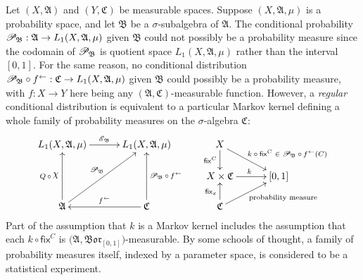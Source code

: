 \documentclass[
twoside=true,
paper=letter,
fontsize=9pt,
pagesize=auto,
leqno,
openany,
headsepline,
overfullrule,
]{scrbook}
\theoremstyle{plain}
\theoremstyle{plain}
\theoremstyle{definition}
\theoremstyle{bfnoteitalic}
\theoremstyle{bfnoteroman}
\newcommand{\sigalg}[1]{\mathfrak{#1}}
\newcommand{\cali}[1]{\mathscr{#1}}
\newcommand{\sfop}[1]{\mathsf{#1}}
\newcommand{\condexpop}[1]{\mathop{\cali{E}\hspace{-1pt}}\nolimits_{#1}}
\newcommand{\condprobop}[1]{\mathop{\cali{P}\hspace{-1pt}}\nolimits_{#1}}
\newcommand{\borel}{\mathfrak{Bor}}
\newcommand{\textsigma}{\hbox{\large{$\sigma$}}\kern-1pt}
\newcommand{\charfunction}[1]{\mathop{{\raisebox{2pt}{$\chi$}}_{#1}}}
\newcommand{\preimage}[1]{\mathop{#1^{\leftarrow}}}
\newcommand{\sigmaalgebra}{\sigalg{A}}
\newcommand{\sigmaalgebraii}{\sigalg{B}}
\newcommand{\sigmaalgebraiii}{\sigalg{C}}
\newcommand{\Lone}{L_1(\measurespace, \sigmaalgebra, \measure)}
\newcommand{\function}{f}
\newcommand{\measurespace}{X}
\newcommand{\measurespaceii}{Y}
\newcommand{\mspaceelt}{x}
\newcommand{\measure}{\mu}
\newcommand{\setiii}{C}
\newcommand{\markovkernel}{k}
\newcommand{\fixinthefirst}[1]{\sfop{fix}_{#1}}
\newcommand{\fixinthesecond}[1]{\sfop{fix}^{#1}}
\begin{document}
Let 
$(\measurespace, \sigmaalgebra)$ and 
$(\measurespaceii, \sigmaalgebraiii)$ be measurable spaces.
Suppose 
$(\measurespace,\sigmaalgebra,\measure)$
is a probability space, and let $\sigmaalgebraii$ be a \textsigma-subalgebra of 
$\sigmaalgebra$. 
The conditional probability 
$
\condprobop{\sigmaalgebraii}:
\sigmaalgebra \to 
L_1(\measurespace,\sigmaalgebra,\measure)
$
given $\sigmaalgebraii$ 
could not possibly be a probability measure since the  codomain
of $\condprobop{\sigmaalgebraii}$ is quotient space
$L_1(\measurespace,\sigmaalgebra,\measure)$ rather than the interval $[0,1]$.
For the same reason, no conditional distribution
${\condprobop{\sigmaalgebraii}}\circ \preimage{\function}
: \sigmaalgebraiii \to L_1(\measurespace,\sigmaalgebra,\measure)$
given $\sigmaalgebraii$
could possibly be a probability measure, 
with $\function:\measurespace\to\measurespaceii$ here being any 
$(\sigmaalgebra,\sigmaalgebraiii)$\hyp{}measurable function.
However, a \emph{regular} conditional distribution is equivalent to a particular Markov kernel defining a whole family of probability measures on the 
\textsigma-algebra $\sigmaalgebraiii$:
\[
\xymatrix@R=16pt@C=30pt{ 
\Lone \ar[r]^{\condexpop{\sigmaalgebraii}}
& \Lone 
& \measurespace 
\ar[d]_-{\fixinthesecond{\setiii}} 
\ar[dr]^{\qquad\text{$\markovkernel\circ\fixinthesecond{\setiii} \in \condprobop{\sigmaalgebraii}\circ \preimage{\function}(\setiii)$}}
\\
& 
& \measurespace\times\sigmaalgebraiii \ar[r]^{\markovkernel} 
& [0,1] 
\\
\sigmaalgebra 
\ar[uu]^{Q\,\circ\, \charfunction{}} 
\ar[uur]^{\condprobop{\sigmaalgebraii}} 
& \sigmaalgebraiii 
\ar[uu]_{\condprobop{\sigmaalgebraii}\circ \preimage{\function}} 
\ar[l]_{\preimage{\function}}
& \sigmaalgebraiii 
\ar[ur]_{\qquad\text{probability measure}} 
\ar[u]^{\fixinthefirst{\mspaceelt}} 
& 
\\
}
\]
Part of the assumption that $\markovkernel$ is a Markov kernel includes the assumption that each $\markovkernel\circ \fixinthesecond{\setiii}$ is
$\bigl(\sigmaalgebra,\borel_{[0,1]}\bigr)$\hyp{}measurable.
By some schools of thought, a family
of probability measures itself, indexed by a parameter space, is considered to be a statistical experiment.
\end{document}
